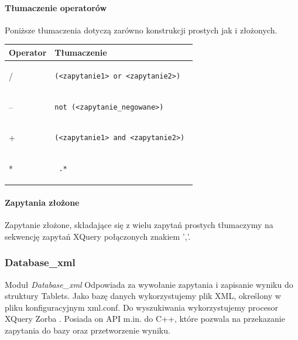 \paragraph{Tłumaczenie operatorów}
Poniższe tłumaczenia dotyczą zarówno konstrukcji prostych jak i złożonych.

\begin{longtable}{|p{1in}|p{3in}|}
\hline
{\bf Operator} & {\bf Tłumaczenie}\\
\hline
\endhead
/ & \begin{verbatim}(<zapytanie1> or <zapytanie2>) \end{verbatim} \\
\hline
-- & \begin{verbatim}not (<zapytanie_negowane>) \end{verbatim}\\  
\hline
+ & \begin{verbatim}(<zapytanie1> and <zapytanie2>) \end{verbatim}\\ 
\hline
* & \begin{verbatim} .*\end{verbatim}  \\ 
\hline
\end{longtable}

\paragraph{Zapytania złożone}
Zapytanie złożone, składające się z wielu zapytań prostych tłumaczymy na sekwencję zapytań XQuery połączonych znakiem ','.

\subsubsection{Database\_xml}
Moduł \textit{Database\_xml} Odpowiada za wywołanie zapytania i zapisanie wyniku do struktury Tablets.
Jako bazę danych wykorzystujemy plik XML, określony w pliku konfiguracyjnym xml.conf. 
Do wyszukiwania wykorzystujemy procesor XQuery Zorba \cite{zorba}. 
Posiada on API m.in. do C++, które pozwala na przekazanie zapytania do bazy oraz przetworzenie wyniku.
